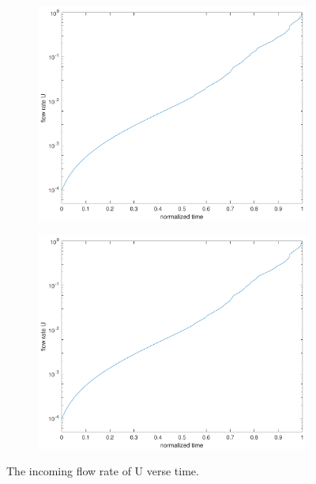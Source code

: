 \documentclass[preprint, 10pt]{elsarticle}
\begin{document}
\begin{figure}[H]
\begin{subfigure}[b]{0.5\textwidth}
\includegraphics*[width =\linewidth]{./figs/flow_rate20dense}
\caption{}
\end{subfigure}%
\begin{subfigure}[b]{0.5\textwidth}
\includegraphics*[width =\linewidth]{./figs/flow_rate20dense}
\caption{}
\end{subfigure}
\caption{\label{fig:Eroding20flowrate}  The incoming flow rate of U verse time.}
\end{figure}
\end{document}
